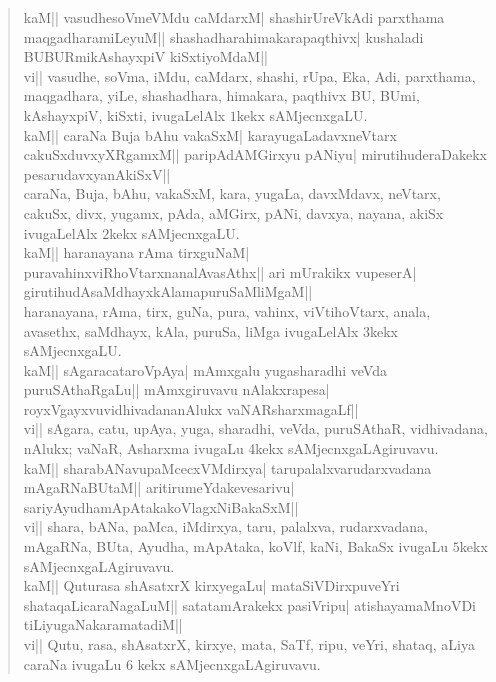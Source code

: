 \begin{verse}
kaM|| vasudhesoVmeVMdu caMdarxM| shashirUreVkAdi parxthama maqgadharamiLeyuM|| shashadharahimakarapaqthivx| kushaladi BUBURmikAshayxpiV kiSxtiyoMdaM||\\

vi|| vasudhe, soVma, iMdu, caMdarx, shashi, rUpa, Eka, Adi, parxthama, maqgadhara, yiLe, shashadhara, himakara, paqthivx BU, BUmi, kAshayxpiV, kiSxti, ivugaLelAlx $1$kekx sAMjecnxgaLU.\\

kaM|| caraNa Buja bAhu vakaSxM| karayugaLadavxneVtarx cakuSxduvxyXRgamxM||
paripAdAMGirxyu pANiyu| mirutihuderaDakekx pesarudavxyanAkiSxV||\\

caraNa, Buja, bAhu, vakaSxM, kara, yugaLa, davxMdavx, neVtarx, cakuSx, divx, yugamx, pAda, aMGirx, pANi, davxya, nayana, akiSx ivugaLelAlx $2$kekx sAMjecnxgaLU.\\

kaM|| haranayana rAma tirxguNaM| puravahinxviRhoVtarxnanalAvasAthx|| ari mUrakikx vupeserA| girutihudAsaMdhayxkAlamapuruSaMliMgaM||\\

haranayana, rAma, tirx, guNa, pura, vahinx, viVtihoVtarx, anala, avasethx, saMdhayx, kAla, puruSa, liMga ivugaLelAlx $3$kekx sAMjecnxgaLU.\\

kaM|| sAgaracataroVpAya| mAmxgalu yugasharadhi veVda puruSAthaRgaLu||
mAmxgiruvavu nAlakxrapesa| royxVgayxvuvidhivadananAlukx vaNARsharxmagaLf||\\

vi|| sAgara, catu, upAya, yuga, sharadhi, veVda, puruSAthaR, vidhivadana, nAlukx; vaNaR, Asharxma ivugaLu 4kekx sAMjecnxgaLAgiruvavu.\\

kaM|| sharabANavupaMcecxVMdirxya| tarupalalxvarudarxvadana mAgaRNaBUtaM|| aritirumeYdakevesarivu| sariyAyudhamApAtakakoVlagxNiBakaSxM||\\

vi|| shara, bANa, paMca, iMdirxya, taru, palalxva, rudarxvadana, mAgaRNa, BUta, Ayudha, mApAtaka, koVlf, kaNi, BakaSx ivugaLu $5$kekx sAMjecnxgaLAgiruvavu.\\

kaM|| Quturasa shAsatxrX kirxyegaLu| mataSiVDirxpuveYri shataqaLicaraNagaLuM|| satatamArakekx pasiVripu| atishayamaMnoVDi tiLiyugaNakaramatadiM||\\

vi|| Qutu, rasa, shAsatxrX, kirxye, mata, SaTf, ripu, veYri, shataq, aLiya caraNa ivugaLu $6$ kekx sAMjecnx\-gaLAgiruvavu.\\


\end{verse}
